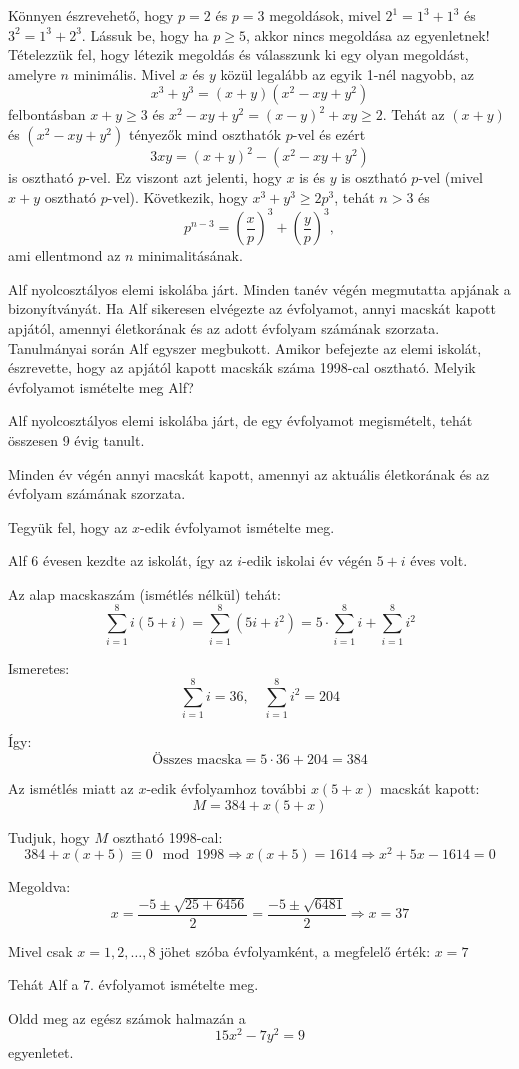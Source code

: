 \begin{solution}
Könnyen észrevehető, hogy $p=2$ és $p=3$ megoldások, mivel $2^{1}=1^{3}+1^{3}$
és $3^{2}=1^{3}+2^{3}.$ Lássuk be, hogy ha $p\ge5$, akkor nincs
megoldása az egyenletnek! Tételezzük fel, hogy létezik megoldás és
válasszunk ki egy olyan megoldást, amelyre $n$ minimális. Mivel $x$
és $y$ közül legalább az egyik 1-nél nagyobb, az 
\[
x^{3}+y^{3}=(x+y)(x^{2}-xy+y^{2})
\]
felbontásban $x+y\ge3$ és $x^{2}-xy+y^{2}=(x-y)^{2}+xy\ge2$. Tehát
az $(x+y)$ és $(x^{2}-xy+y^{2})$ tényezők mind oszthatók $p$-vel
és ezért 
\[
3xy=(x+y)^{2}-(x^{2}-xy+y^{2})
\]
is osztható $p$-vel. Ez viszont azt jelenti, hogy $x$ is és $y$
is osztható $p$-vel (mivel $x+y$ osztható $p$-vel). Következik,
hogy $x^{3}+y^{3}\ge2p^{3}$, tehát $n>3$ és 
\[
p^{n-3}=\left(\frac{x}{p}\right)^{3}+\left(\frac{y}{p}\right)^{3},
\]
ami ellentmond az $n$ minimalitásának. 
\end{solution}
\begin{extraproblem}
Alf nyolcosztályos elemi iskolába járt. Minden tanév végén megmutatta
apjának a bizonyítványát. Ha Alf sikeresen elvégezte az évfolyamot,
annyi macskát kapott apjától, amennyi életkorának és az adott évfolyam
számának szorzata. Tanulmányai során Alf egyszer megbukott. Amikor
befejezte az elemi iskolát, észrevette, hogy az apjától kapott macskák
száma 1998-cal osztható. Melyik évfolyamot ismételte meg Alf? 
\end{extraproblem}

\begin{solution}
Alf nyolcosztályos elemi iskolába járt, de egy évfolyamot megismételt,
tehát összesen 9 évig tanult.

Minden év végén annyi macskát kapott, amennyi az aktuális életkorának
és az évfolyam számának szorzata.

Tegyük fel, hogy az $x$-edik évfolyamot ismételte meg.

Alf 6 évesen kezdte az iskolát, így az $i$-edik iskolai év végén
$5+i$ éves volt.

Az alap macskaszám (ismétlés nélkül) tehát: 
\[
\sum_{i=1}^{8}i(5+i)=\sum_{i=1}^{8}(5i+i^{2})=5\cdot\sum_{i=1}^{8}i+\sum_{i=1}^{8}i^{2}
\]

Ismeretes: 
\[
\sum_{i=1}^{8}i=36,\quad\sum_{i=1}^{8}i^{2}=204
\]

Így: 
\[
\text{Összes macska}=5\cdot36+204=384
\]

Az ismétlés miatt az $x$-edik évfolyamhoz további $x(5+x)$ macskát
kapott: 
\[
M=384+x(5+x)
\]

Tudjuk, hogy $M$ osztható 1998-cal: 
\[
384+x(x+5)\equiv0\mod{1998}\Rightarrow x(x+5)=1614\Rightarrow x^{2}+5x-1614=0
\]

Megoldva: 
\[
x=\frac{-5\pm\sqrt{25+6456}}{2}=\frac{-5\pm\sqrt{6481}}{2}\Rightarrow x=37
\]

Mivel csak $x=1,2,\dots,8$ jöhet szóba évfolyamként, a megfelelő
érték: $x=7$

Tehát Alf a 7. évfolyamot ismételte meg.
\end{solution}
\begin{extraproblem}
Oldd meg az egész számok halmazán a 
\[
15x^{2}-7y^{2}=9
\]
egyenletet. 
\end{extraproblem}

